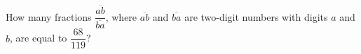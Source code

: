 How many fractions $\dfrac{\overline{ab}}{\overline{ba}}$, where $\overline{ab}$ and $\overline{ba}$ are two-digit numbers with digits $a$ and $b$, are equal to $\dfrac{68}{119}$?
